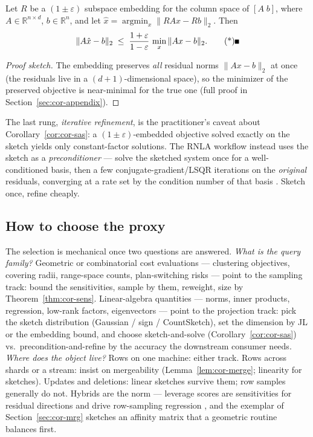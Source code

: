 \begin{corollary}\label{cor:cor-sas}
Let $R$ be a $(1\pm\varepsilon)$ subspace embedding for the column
space of $[A \; b]$, where $A \in \mathbb{R}^{n\times d}$, $b \in
\mathbb{R}^n$, and let $\hat{x} = \operatorname{argmin}_{x} \|RAx -
Rb\|_2$. Then
\[
\|A\hat{x} - b\|_2 \;\le\; \frac{1+\varepsilon}{1-\varepsilon}\,
\min_{x}\|Ax - b\|_2. \eopm
\]
\end{corollary}

\begin{proof}[Proof sketch]
The embedding preserves \emph{all} residual norms $\|Ax - b\|_2$ at once
(the residuals live in a $(d{+}1)$-dimensional space), so the minimizer
of the preserved objective is near-minimal for the true one (full proof
in Section~\ref{sec:cor-appendix}).
\end{proof}

The last rung, \emph{iterative refinement}, is the practitioner's
caveat about Corollary~\ref{cor:cor-sas}: a $(1\pm\varepsilon)$-embedded
objective solved exactly on the sketch yields only constant-factor
solutions. The RNLA workflow instead uses the sketch as a
\emph{preconditioner} --- solve the sketched system once for a
well-conditioned basis, then a few conjugate-gradient/LSQR iterations on
the \emph{original} residuals, converging at a rate set by the condition
number of that basis \citep{coresets-rnla-bg6,coresets-rnla-bg7,
coresets-rnla-bg14}. Sketch once, refine cheaply.

\subsection{How to choose the proxy}
\label{sec:cor-choose}

The selection is mechanical once two questions are answered. \emph{What
is the query family?} Geometric or combinatorial cost evaluations ---
clustering objectives, covering radii, range-space counts,
plan-switching risks --- point to the sampling track: bound the
sensitivities, sample by them, reweight, size by
Theorem~\ref{thm:cor-sens}. Linear-algebra quantities --- norms, inner
products, regression, low-rank factors, eigenvectors --- point to the
projection track: pick the sketch distribution (Gaussian / sign /
CountSketch), set the dimension by JL or the embedding bound, and
choose sketch-and-solve (Corollary~\ref{cor:cor-sas}) vs.\
precondition-and-refine by the accuracy the downstream consumer needs.
\emph{Where does the object live?} Rows on one machine: either track.
Rows across shards or a stream: insist on mergeability
(Lemma~\ref{lem:cor-merge}; linearity for sketches). Updates and
deletions: linear sketches survive them; row samples generally do not.
Hybrids are the norm --- leverage scores are sensitivities for residual
directions and drive row-sampling regression
\citep{coresets-rnla-bg8}, and the exemplar of
Section~\ref{sec:cor-mrg} sketches an affinity matrix that a geometric
routine balances first.

